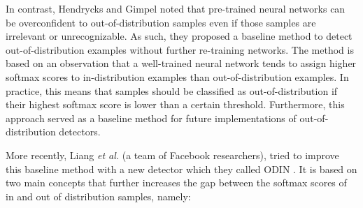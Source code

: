     In contrast, Hendrycks and Gimpel \cite{Hendrycks2019} noted that pre-trained neural networks can be overconfident to out-of-distribution samples even if those samples are irrelevant or unrecognizable. As such, they proposed a baseline method to detect out-of-distribution examples without further re-training networks. The method is based on an observation that a well-trained neural network tends to assign higher softmax scores to in-distribution examples than out-of-distribution examples. In practice, this means that samples should be classified as out-of-distribution if their highest softmax score is lower than a certain threshold. Furthermore, this approach served as a baseline method for future implementations of out-of-distribution detectors.  \par
    
    More recently, Liang \textit{et al.} (a team of Facebook researchers), tried to improve this baseline method with a new detector which they called \ac{ODIN} \cite{odin}. It is based on two main concepts that further increases the gap between the softmax scores of in and out of distribution samples, namely:
